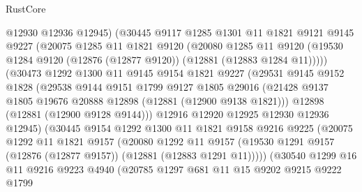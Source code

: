 \begin{lexlean}{RustCore}
\begin{coremodule}
                  @12930
                  @12936
                  @12945)
                (@30445
                  @9117
                  @1285
                  @1301
                  @11
                  @1821
                  @9121
                  @9145
                  @9227
                  (@20075
                    @1285
                    @11
                    @1821
                    @9120
                    (@20080
                      @1285
                      @11
                      @9120
                      (@19530 @1284 @9120 (@12876 (@12877 @9120)) (@12881 (@12883 @1284 @11)))))
                  (@30473
                    @1292
                    @1300
                    @11
                    @9145
                    @9154
                    @1821
                    @9227
                    (@29531
                      @9145
                      @9152
                      @1828
                      (@29538
                        @9144
                        @9151
                        @1799
                        @9127
                        @1805
                        @29016
                        (@21428 @9137 @1805 @19676 @20888 @12898 (@12881 (@12900 @9138 @1821)))
                        @12898
                        (@12881 (@12900 @9128 @9144)))
                      @12916
                      @12920
                      @12925
                      @12930
                      @12936
                      @12945)
                    (@30445
                      @9154
                      @1292
                      @1300
                      @11
                      @1821
                      @9158
                      @9216
                      @9225
                      (@20075
                        @1292
                        @11
                        @1821
                        @9157
                        (@20080
                          @1292
                          @11
                          @9157
                          (@19530 @1291 @9157 (@12876 (@12877 @9157)) (@12881 (@12883 @1291 @11)))))
                      (@30540
                        @1299
                        @16
                        @11
                        @9216
                        @9223
                        @4940
                        (@20785
                          @1297
                          @681
                          @11
                          @15
                          @9202
                          @9215
                          @9222
                          @1799

\end{coremodule}
\end{lexlean}
